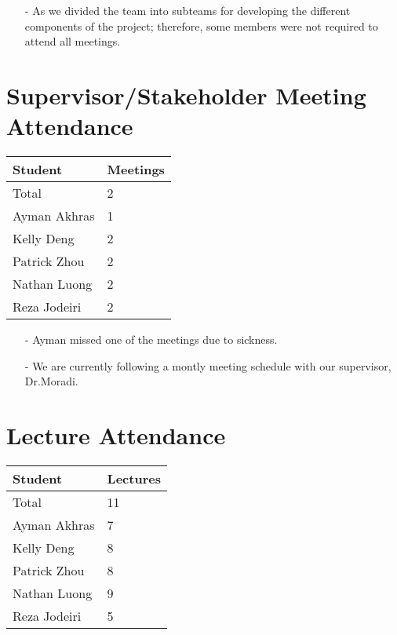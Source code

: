 \documentclass{article}
\begin{document}
\begin{itemize}
    \item[-] As we divided the team into subteams for developing the different components of the project; therefore, some members were not required to attend all meetings.
\end{itemize}

\section{Supervisor/Stakeholder Meeting Attendance}

\begin{table}[H]
\centering
\begin{tabular}{ll}
\toprule
\textbf{Student} & \textbf{Meetings}\\
\midrule
Total & 2\\
Ayman Akhras & 1\\
Kelly Deng & 2\\
Patrick Zhou  & 2\\
Nathan Luong & 2\\
Reza Jodeiri& 2\\
\bottomrule
\end{tabular}
\end{table}

\begin{itemize}
    \item[-] Ayman missed one of the meetings due to sickness.
    \item[-] We are currently following a montly meeting schedule with our supervisor, Dr.Moradi.
\end{itemize}

\section{Lecture Attendance}

\begin{table}[H]
\centering
\begin{tabular}{ll}
\toprule
\textbf{Student} & \textbf{Lectures}\\
\midrule
Total & 11\\
Ayman Akhras & 7\\
Kelly Deng & 8\\
Patrick Zhou  & 8\\
Nathan Luong & 9\\
Reza Jodeiri& 5\\
\bottomrule
\end{tabular}
\end{table}
\end{document}
